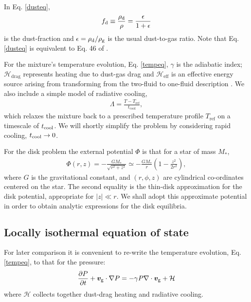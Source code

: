 In Eq. \ref{dusteq}, 
\begin{align}
  f_\mathrm{d} \equiv \frac{\rho_\mathrm{d}}{\rho}  = \frac{\epsilon}{1+\epsilon} 
\end{align}
is the dust-fraction and $\epsilon=\rho_\mathrm{d}/\rho_\mathrm{g}$ is the usual
dust-to-gas ratio. Note that Eq. \ref{dusteq} is 
equivalent to Eq. 46 of \cite{jacquet11}. 

For the mixture's temperature evolution, Eq. \ref{tempeq}, $\gamma$ is
the adiabatic index; $\mathcal{H}_\mathrm{drag}$ represents heating
due to dust-gas drag and $\mathcal{H}_\mathrm{eff}$ is an effective
energy source arising from transforming from the two-fluid to
one-fluid description \citep[see][ for details]{laibe14}. We also
include a simple model of radiative cooling,
\begin{align}
  \Lambda = \frac{T -
    T_\mathrm{ref}}{t_\mathrm{cool}}, \label{realenergy} 
\end{align}
which relaxes the mixture back to a prescribed temperature profile   
$T_\mathrm{ref}$ on a timescale of $t_\mathrm{cool}$. We will shortly simplify
the problem by considering rapid cooling, $t_\mathrm{cool}\to0$. 


For the disk problem the external potential $\Phi$ is  
that for a star of mass $M_*$, 
\begin{align}\label{thin_disk_potential}
  \Phi(r,z) =-\frac{GM_*}{\sqrt{r^2 + z^2}}\simeq
  -\frac{GM_*}{r}\left(1 - \frac{z^2}{2r^2}\right), 
\end{align}
where $G$ is the gravitational constant, and $(r,\phi, z)$ are
cylindrical co-ordinates centered on the star. 
The second equality is the 
thin-disk approximation for the disk potential, appropriate for
$|z|\ll r$. We shall adopt this approximate potential in order to
obtain analytic expressions for the disk equilibria.  

\subsection{Locally isothermal equation of state}\label{loc_iso_eos}
For later comparison it is convenient to re-write the temperature
evolution, Eq. \ref{tempeq}, to that for the pressure: 
\begin{align}
  \frac{\partial P}{\partial t} + \bm{v}_\mathrm{g}\cdot\nabla P = - \gamma P
  \nabla\cdot \bm{v}_\mathrm{g}  + \mathcal{H} 
\end{align}
where $\mathcal{H}$ collects together dust-drag heating and radiative
cooling. 


